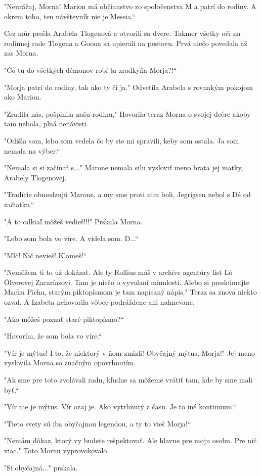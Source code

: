 \documentclass{book}
\begin{document}
"$ $Neurážaj, Morna! Marion má občianstvo zo spoločenstva M a patrí do rodiny. A okrem toho, ten návštevník nie je Messia.“

Cez múr prešla Arabela Tlogenová a otvorili sa dvere. Takmer všetky oči na rodinnej rade Tlogena a Goona sa upierali na postavu. Prvá niečo povedala až zas Morna.

"$ $Čo tu do všetkých démonov robí ta zradkyňa Morja?!“

"$ $Morja patrí do rodiny, tak ako ty či ja."$ $ Odvetila Arabela s rovnakým pokojom ako Marion.

"$ $Zradila nás, pošpinila našu rodinu,"$ $ Hovorila teraz Morna o svojej dcére akoby tam nebola, plná nenávisti.

"$ $Odišla som, lebo som vedela čo by ste mi spravili, keby som ostala. Ja som nemala na výber.“

"$ $Nemala si si začínať s..."$ $ Marone nemala silu vysloviť meno brata jej matky, Arabely Tlogenovej.

"$ $Tradície obmedzujú Marone, a my sme proti nim boli, Jegrigsen nebol s Dé od začiatku.“

"$ $A to odkiaľ môžeš vedieť!!!"$ $ Prskala Morna.

"$ $Lebo som bola vo víre. A videla som. D...“

"$ $Mlč! Nič nevieš! Klameš!“

"$ $Nemôžem ti to už dokázať. Ale ty Rollius máš v archíve agentúry list Ló Ölverovej Zacaríasovi. Tam je niečo o vyvolaní minulosti. Alebo si preskúmajte Machu Pichu, starým piktopísmom je tam napísaný nápis."$ $ Teraz sa znova niekto ozval. A Izabeta nehovorila vôbec podráždene ani nahnevane.

"$ $Ako môžeš poznať staré piktopísmo?“

"$ $Hovorím, že som bola vo víre.“

"$ $Vír je mýtus! I to, že niektorý v ňom zmizli! Obyčajný mýtus, Morja!"$ $ Jej meno vyslovila Morna so značným opovrhnutím.

"$ $Ak sme pre toto zvolávali radu, kľudne sa môžeme vrátiť tam, kde by sme mali byť.“

"$ $Vír nie je mýtus. Vír ozaj je. Ako vytrhnutý z času. Je to iné kontinuum.“

"$ $Tieto svety sú iba obyčajnou legendou, a ty to vieš Morja!“

"$ $Nemám dôkaz, ktorý vy budete rešpektovať. Ale hlavne pre moju osobu. Pre nič viac."$ $ Toto Mornu vyprovokovalo.

"$ $Si obyčajná..."$ $ prskala.
\end{document}
